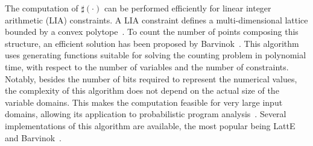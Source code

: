 The computation of $\sharp(\cdot)$ can be performed efficiently for linear integer arithmetic (LIA) constraints.
A LIA constraint defines a multi-dimensional lattice bounded by a convex polytope~\cite{de2008computationalGeometry}. To count the number of points composing this structure, an efficient solution has been proposed by Barvinok~\cite{barvinok1994polynomial}. This algorithm uses generating functions suitable for solving the counting problem in polynomial time, with respect to the number of variables and the number of constraints. Notably, besides the number of bits required to represent the numerical values, the complexity of this algorithm does not depend on the actual size of the variable domains. This makes the computation feasible for very large input domains, allowing its application to probabilistic program analysis~\cite{Geldenhuys2012,Filieri2013,Filieri2015}. Several implementations of this algorithm are available, the most popular being LattE~\cite{LattESoftware} and Barvinok~\cite{verdoolaegesoftware}. 


